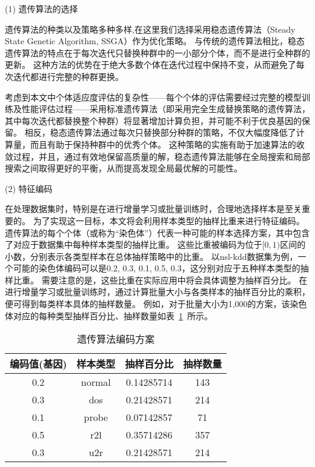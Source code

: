 (1) 遗传算法的选择\par
遗传算法的种类以及策略多种多样,在这里我们选择采用稳态遗传算法（Steady State Genetic Algorithm, SSGA）作为优化策略。
与传统的遗传算法相比，稳态遗传算法的特点在于每次迭代只替换种群中的一小部分个体，而不是进行全种群的更新。
这种方法的优势在于绝大多数个体在迭代过程中保持不变，从而避免了每次迭代都进行完整的种群更换。\par

考虑到本文中个体适应度评估的复杂性——每个个体的评估需要经过完整的模型训练及性能评估过程——采用标准遗传算法（即采用完全生成替换策略的遗传算法，其中每次迭代都替换整个种群）将显著增加计算负担，并可能不利于优良基因的保留。
相反，稳态遗传算法通过每次只替换部分种群的策略，不仅大幅度降低了计算量，而且有助于保持种群中的优秀个体。
这种策略的实施有助于加速算法的收敛过程，并且，通过有效地保留高质量的解，稳态遗传算法能够在全局搜索和局部搜索之间取得更好的平衡，从而提高发现全局最优解的可能性。

(2) 特征编码\par
在处理数据集时，特别是在进行增量学习或批量训练时，合理地选择样本是至关重要的。
为了实现这一目标，本文将会利用样本类型的抽样比重来进行特征编码。
遗传算法的每个个体（或称为“染色体”）代表一种可能的样本选择方案，其中包含了对应于数据集中每种样本类型的抽样比重。
这些比重被编码为位于$[0,1)$区间的小数，分别表示各类型样本在总体抽样策略中的比重。
以nsl-kdd数据集为例，一个可能的染色体编码可以是{0.2, 0.3, 0.1, 0.5, 0.3}，这分别对应于五种样本类型的抽样比重。
需要注意的是，这些比重在实际应用中将会具体调整为抽样百分比。
在进行增量学习或批量训练时，通过计算批量大小与各类样本的抽样百分比的乘积，便可得到每类样本具体的抽样数量。
例如，对于批量大小为1,000的方案，该染色体对应的每种类型抽样百分比、抽样数量如表~\ref{tab:Ga_code}~所示。\par

\begin{table}
  \caption{遗传算法编码方案}
  \label{tab:Ga_code}
  \centering
  \begin{tabular}{cccc}
    \toprule
    \textbf{编码值(基因)}&\textbf{样本类型}&\textbf{抽样百分比}&\textbf{抽样数量}\\
    \midrule
    0.2&normal&0.14285714&143\\
    0.3&dos&0.21428571&214\\
    0.1&probe&0.07142857&71\\
    0.5&r2l&0.35714286&357\\
    0.3&u2r&0.21428571&214\\
    \bottomrule
  \end{tabular}
\end{table}

